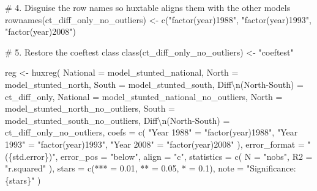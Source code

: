 \documentclass[
  letterpaper,
  DIV=11,
  numbers=noendperiod]{scrartcl}
\newenvironment{Shaded}{\begin{snugshade}}{\end{snugshade}}
\newcommand{\AttributeTok}[1]{\textcolor[rgb]{0.40,0.45,0.13}{#1}}
\newcommand{\CommentTok}[1]{\textcolor[rgb]{0.37,0.37,0.37}{#1}}
\newcommand{\FloatTok}[1]{\textcolor[rgb]{0.68,0.00,0.00}{#1}}
\newcommand{\FunctionTok}[1]{\textcolor[rgb]{0.28,0.35,0.67}{#1}}
\newcommand{\NormalTok}[1]{\textcolor[rgb]{0.00,0.23,0.31}{#1}}
\newcommand{\OtherTok}[1]{\textcolor[rgb]{0.00,0.23,0.31}{#1}}
\newcommand{\SpecialCharTok}[1]{\textcolor[rgb]{0.37,0.37,0.37}{#1}}
\newcommand{\StringTok}[1]{\textcolor[rgb]{0.13,0.47,0.30}{#1}}
\begin{document}
\begin{Shaded}
\begin{Highlighting}[]
\CommentTok{\# 4. Disguise the row names so huxtable aligns them with the other models}
\FunctionTok{rownames}\NormalTok{(ct\_diff\_only\_no\_outliers) }\OtherTok{\textless{}{-}} \FunctionTok{c}\NormalTok{(}\StringTok{"factor(year)1988"}\NormalTok{, }\StringTok{"factor(year)1993"}\NormalTok{, }\StringTok{"factor(year)2008"}\NormalTok{)}

\CommentTok{\# 5. Restore the coeftest class}
\FunctionTok{class}\NormalTok{(ct\_diff\_only\_no\_outliers) }\OtherTok{\textless{}{-}} \StringTok{"coeftest"}

\NormalTok{reg }\OtherTok{\textless{}{-}} \FunctionTok{huxreg}\NormalTok{(}
  \StringTok{\textasciigrave{}}\AttributeTok{National}\StringTok{\textasciigrave{}}             \OtherTok{=}\NormalTok{ model\_stunted\_national,}
  \StringTok{\textasciigrave{}}\AttributeTok{North}\StringTok{\textasciigrave{}}                \OtherTok{=}\NormalTok{ model\_stunted\_north,}
  \StringTok{\textasciigrave{}}\AttributeTok{South}\StringTok{\textasciigrave{}}                \OtherTok{=}\NormalTok{ model\_stunted\_south,}
  \StringTok{\textasciigrave{}}\AttributeTok{Diff}\SpecialCharTok{\textbackslash{}n}\AttributeTok{(North{-}South)}\StringTok{\textasciigrave{}}  \OtherTok{=}\NormalTok{ ct\_diff\_only,}
  \StringTok{\textasciigrave{}}\AttributeTok{National }\StringTok{\textasciigrave{}}            \OtherTok{=}\NormalTok{ model\_stunted\_national\_no\_outliers,}
  \StringTok{\textasciigrave{}}\AttributeTok{North }\StringTok{\textasciigrave{}}               \OtherTok{=}\NormalTok{ model\_stunted\_north\_no\_outliers,}
  \StringTok{\textasciigrave{}}\AttributeTok{South }\StringTok{\textasciigrave{}}               \OtherTok{=}\NormalTok{ model\_stunted\_south\_no\_outliers,}
  \StringTok{\textasciigrave{}}\AttributeTok{Diff}\SpecialCharTok{\textbackslash{}n}\AttributeTok{(North{-}South) }\StringTok{\textasciigrave{}}  \OtherTok{=}\NormalTok{ ct\_diff\_only\_no\_outliers,}
   \AttributeTok{coefs =} \FunctionTok{c}\NormalTok{(}
    \StringTok{"Year 1988"} \OtherTok{=} \StringTok{"factor(year)1988"}\NormalTok{,}
    \StringTok{"Year 1993"} \OtherTok{=} \StringTok{"factor(year)1993"}\NormalTok{,}
    \StringTok{"Year 2008"} \OtherTok{=} \StringTok{"factor(year)2008"}
\NormalTok{  ),}
  \AttributeTok{error\_format =} \StringTok{"(\{std.error\})"}\NormalTok{,}
  \AttributeTok{error\_pos =} \StringTok{"below"}\NormalTok{,}
  \AttributeTok{align =} \StringTok{"c"}\NormalTok{,}
  \AttributeTok{statistics =} \FunctionTok{c}\NormalTok{(}
    \AttributeTok{N =} \StringTok{"nobs"}\NormalTok{,}
    \AttributeTok{R2 =} \StringTok{"r.squared"}
\NormalTok{  ),}
  \AttributeTok{stars =} \FunctionTok{c}\NormalTok{(}\StringTok{\textasciigrave{}}\AttributeTok{***}\StringTok{\textasciigrave{}} \OtherTok{=} \FloatTok{0.01}\NormalTok{, }\StringTok{\textasciigrave{}}\AttributeTok{**}\StringTok{\textasciigrave{}} \OtherTok{=} \FloatTok{0.05}\NormalTok{, }\StringTok{\textasciigrave{}}\AttributeTok{*}\StringTok{\textasciigrave{}} \OtherTok{=} \FloatTok{0.1}\NormalTok{),}
  \AttributeTok{note =} \StringTok{"Significance: \{stars\}"}
\NormalTok{)}


\end{Highlighting}
\end{Shaded}
\end{document}

